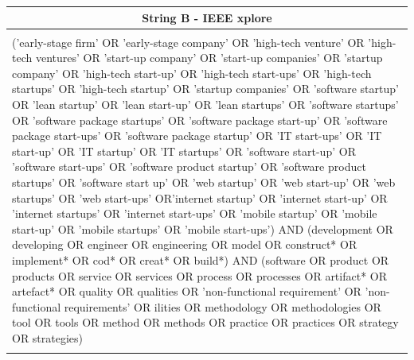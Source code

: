 \documentclass[final,5p,times,twocolumn]{elsarticle}
\begin{document}
\begin{longtable}{|p{5.3in}|}
\multicolumn{1}{|c|}{String B - IEEE xplore \cite{IEEExpl}} \\
\hline  
\hspace{1in}\\
('early-stage firm' OR 'early-stage company' OR 'high-tech venture' OR 'high-tech ventures' OR 'start-up company' OR 'start-up companies' OR 'startup company' OR 'high-tech start-up' OR 'high-tech start-ups' OR 'high-tech startups' OR 'high-tech startup' OR 'startup companies' OR 'software startup' OR 'lean startup' OR 'lean start-up' OR 'lean startups' OR 'software startups' OR 'software package startups' OR 'software package start-up' OR 'software package start-ups' OR 'software package startup' OR 'IT start-ups' OR 'IT start-up' OR 'IT startup' OR 'IT startups' OR 'software start-up' OR 'software start-ups' OR 'software product startup' OR 'software product startups' OR 'software start up' OR 'web startup' OR 'web start-up' OR 'web startups' OR 'web start-ups' OR'internet startup' OR 'internet start-up' OR 'internet startups' OR 'internet start-ups' OR 'mobile startup' OR 'mobile start-up' OR 'mobile startups' OR 'mobile start-ups') AND (development OR developing OR engineer OR engineering OR model OR construct* OR implement* OR cod* OR creat* OR build*) AND (software OR product OR products OR service OR services OR process OR processes OR artifact* OR artefact* OR quality OR qualities OR 'non-functional requirement' OR 'non-functional requirements' OR ilities OR methodology OR methodologies OR tool OR tools OR method OR methods OR practice OR practices OR strategy OR strategies) \\
\hspace{3in}\\
\hline \hline


\end{longtable}
\end{document}
